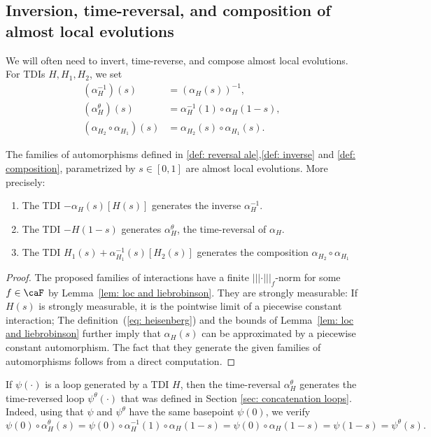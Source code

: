 \subsection{Inversion, time-reversal, and composition of almost local evolutions}\label{sec:composition}



We will often need to invert, time-reverse, and compose almost local evolutions. For TDIs $H,H_1,H_2$, we set
\begin{align}
(\alpha_H^{-1})(s) &= (\alpha_H(s))^{-1},\label{def: inverse} \\
(\alpha^{\theta}_H)(s) & = \alpha^{-1}_H(1)\circ \alpha_H(1-s), \label{def: reversal ale} \\
(\alpha_{H_2}\circ\alpha_{H_1})(s) &= \alpha_{H_2}(s)\circ\alpha_{H_1}(s).  \label{def: composition}
\end{align}

\begin{lemma}\label{lem: manipulation of evolutions}
	The families of automorphisms defined in \eqref{def: reversal ale},\eqref{def: inverse} and \eqref{def: composition}, parametrized by $s\in [0,1]$ are almost local evolutions. More precisely: 
	\begin{enumerate}
		\item The TDI $-\alpha_H(s)[H(s)]$ generates the inverse $\alpha_H^{-1}$.
		\item  The TDI $-H(1-s)$ generates  $\alpha^{\theta}_H$, the time-reversal of $\alpha_H$. 
		\item The TDI $H_1(s)+\alpha_{H_1}^{-1}(s)[H_2(s)]$ generates the composition $ \alpha_{H_2}\circ\alpha_{H_1}$
	\end{enumerate}
\end{lemma}
\begin{proof}
	The proposed families of interactions have a finite $|||\cdot|||_{f}$-norm for some $f\in\caF$ by Lemma~\ref{lem: loc and liebrobinson}. They are strongly measurable: If $H(s)$ is strongly measurable, it is the pointwise limit of a piecewise constant interaction; The definition~(\ref{eq: heisenberg}) and the bounds of Lemma~\ref{lem: loc and liebrobinson} further imply that $\alpha_H(s)$ can be approximated by a piecewise constant automorphism. The fact that they generate the given families of automorphisms follows from a direct computation.
\end{proof}
If $\psi(\cdot)$ is a loop generated by a TDI $H$, then the time-reversal $\alpha^{\theta}_H$ generates the time-reversed loop ${\psi^{\theta}}(\cdot)$ that was defined in Section \ref{sec: concatenation loops}. 
Indeed, using that $\psi$ and $\psi^\theta$ have the same basepoint $\psi(0)$, we verify
$$
{\psi}(0)\circ \alpha^{\theta}_H(s)= {\psi}(0)\circ    \alpha^{-1}_H(1)\circ \alpha_H(1-s) =  {\psi}(0)\circ  \alpha_H(1-s)= \psi(1-s)=\psi^\theta(s). 
$$


